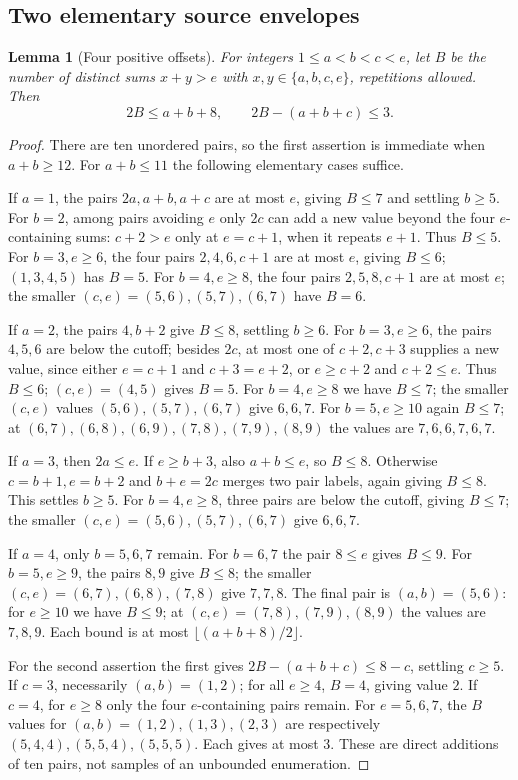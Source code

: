 \documentclass[11pt,letterpaper]{article}
\newtheorem{lemma}[theorem]{Lemma}
\theoremstyle{definition}\newtheorem{definition}[theorem]{Definition}
\begin{document}
\subsection{Two elementary source envelopes}
\begin{lemma}[Four positive offsets]\label{lem:common-offsets}
For integers $1\le a<b<c<e$, let $B$ be the number of distinct sums
$x+y>e$ with $x,y\in\{a,b,c,e\}$, repetitions allowed. Then
\[
2B\le a+b+8,\qquad 2B-(a+b+c)\le3.
\]
\end{lemma}
\begin{proof}
There are ten unordered pairs, so the first assertion is immediate
when $a+b\ge12$. For $a+b\le11$ the following elementary cases suffice.

If $a=1$, the pairs $2a,a+b,a+c$ are at most $e$, giving $B\le7$
and settling $b\ge5$. For $b=2$, among pairs avoiding $e$ only $2c$
can add a new value beyond the four $e$-containing sums: $c+2>e$
only at $e=c+1$, when it repeats $e+1$. Thus $B\le5$.
For $b=3,e\ge6$, the four pairs $2,4,6,c+1$ are at most $e$,
giving $B\le6$; $(1,3,4,5)$ has $B=5$.
For $b=4,e\ge8$, the four pairs $2,5,8,c+1$ are at most $e$;
the smaller $(c,e)=(5,6),(5,7),(6,7)$ have $B=6$.

If $a=2$, the pairs $4,b+2$ give $B\le8$, settling $b\ge6$.
For $b=3,e\ge6$, the pairs $4,5,6$ are below the cutoff; besides
$2c$, at most one of $c+2,c+3$ supplies a new value, since either
$e=c+1$ and $c+3=e+2$, or $e\ge c+2$ and $c+2\le e$.
Thus $B\le6$; $(c,e)=(4,5)$ gives $B=5$.
For $b=4,e\ge8$ we have $B\le7$; the smaller $(c,e)$ values
$(5,6),(5,7),(6,7)$ give $6,6,7$.
For $b=5,e\ge10$ again $B\le7$; at
$(6,7),(6,8),(6,9),(7,8),(7,9),(8,9)$ the values are $7,6,6,7,6,7$.

If $a=3$, then $2a\le e$. If $e\ge b+3$, also $a+b\le e$,
so $B\le8$. Otherwise $c=b+1,e=b+2$ and $b+e=2c$ merges
two pair labels, again giving $B\le8$. This settles $b\ge5$.
For $b=4,e\ge8$, three pairs are below the cutoff, giving $B\le7$;
the smaller $(c,e)=(5,6),(5,7),(6,7)$ give $6,6,7$.

If $a=4$, only $b=5,6,7$ remain. For $b=6,7$ the pair $8\le e$
gives $B\le9$. For $b=5,e\ge9$, the pairs $8,9$ give $B\le8$;
the smaller $(c,e)=(6,7),(6,8),(7,8)$ give $7,7,8$.
The final pair is $(a,b)=(5,6)$: for $e\ge10$ we have $B\le9$;
at $(c,e)=(7,8),(7,9),(8,9)$ the values are $7,8,9$.
Each bound is at most $\lfloor(a+b+8)/2\rfloor$.

For the second assertion the first gives $2B-(a+b+c)\le8-c$,
settling $c\ge5$. If $c=3$, necessarily $(a,b)=(1,2)$;
for all $e\ge4$, $B=4$, giving value $2$.
If $c=4$, for $e\ge8$ only the four $e$-containing pairs remain.
For $e=5,6,7$, the $B$ values for $(a,b)=(1,2),(1,3),(2,3)$
are respectively $(5,4,4),(5,5,4),(5,5,5)$. Each gives at most $3$.
These are direct additions of ten pairs, not samples of an unbounded
enumeration.
\end{proof}
\end{document}

